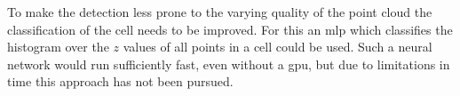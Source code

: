 To make the detection less prone to the varying quality of the point cloud the classification of the cell needs to be improved. For this an \ac{mlp} which classifies the histogram over the $z$ values of all points in a cell could be used. Such a neural network would run sufficiently fast, even without a \ac{gpu}, but due to limitations in time this approach has not been pursued.
